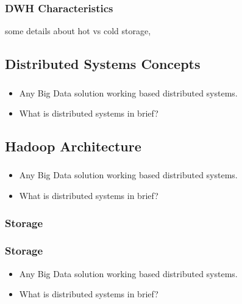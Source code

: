 
\begin{frame}
\frametitle{DWH Characteristics}

some details about hot vs cold storage,

\end{frame}


\subsection{Distributed Systems Concepts}
\begin{frame}
\frametitle{\subsecname}
\begin{itemize}[<+->]
	\item Any Big Data solution working based distributed systems.
	\item What is distributed systems in brief?
\end{itemize}
\end{frame}


\subsection{Hadoop Architecture}
\begin{frame}
\frametitle{\subsecname}
\begin{itemize}[<+->]
	\item Any Big Data solution working based distributed systems.
	\item What is distributed systems in brief?
\end{itemize}
\end{frame}



\subsubsection{Storage}
\begin{frame}
\frametitle{Storage}
\begin{itemize}[<+->]
	\item Any Big Data solution working based distributed systems.
	\item What is distributed systems in brief?
\end{itemize}
\end{frame}

